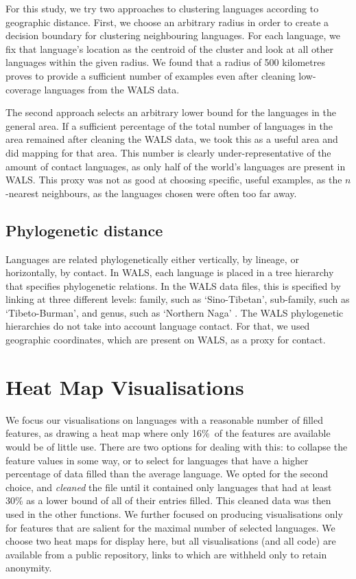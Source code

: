 \documentclass[11pt]{article}
\begin{document}
For this study, we try two approaches to clustering languages according to geographic distance. First, we choose an arbitrary radius in order to create a decision boundary for clustering neighbouring languages. For each language, we fix that language's location as the centroid of the cluster and look at all other languages within the given radius. We found that a radius of 500 kilometres proves to provide a sufficient number of examples even after cleaning low-coverage languages from the WALS data. 

The second approach selects an arbitrary lower bound for the languages in the general area. If a sufficient percentage of the total number of languages in the area remained after cleaning the WALS data, we took this as a useful area and did mapping for that area. This number is clearly under-representative of the amount of contact languages, as only half of the world's languages are present in WALS. This proxy was not as good at choosing specific, useful examples, as the $n$-nearest neighbours, as the languages chosen were often too far away. 

\subsection{Phylogenetic distance}

Languages are related phylogenetically either vertically, by lineage, or horizontally, by contact. In WALS, each language is placed in a tree hierarchy that specifies phylogenetic relations. In the WALS data files, this is specified by linking at three different levels: family, such as `Sino-Tibetan', sub-family, such as `Tibeto-Burman', and genus, such as `Northern Naga' . The WALS phylogenetic hierarchies do not take into account language contact. For that, we used geographic coordinates, which are present on WALS, as a proxy for contact. 


\section{Heat Map Visualisations}

We focus our visualisations on languages with a reasonable number of filled features, as drawing a heat map where only 16\%~of the features are available would be of little use. There are two options for dealing with this: to collapse the feature values in some way, or to select for languages that have a higher percentage of data filled than the average language. We opted for the second choice, and \emph{cleaned}  the file until it contained only languages that had at least 30\% as a lower bound of all of their entries filled. This cleaned data was then used in the other functions. We further focused on producing visualisations only for features that are salient for the maximal number of selected languages. We choose two heat maps for display here, but all visualisations (and all code) are available from a public repository, links to which are withheld only to retain anonymity. 
\end{document}
